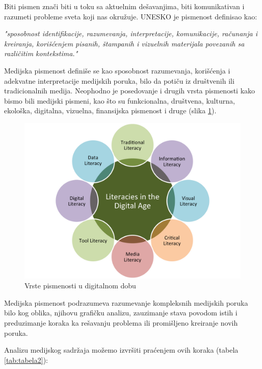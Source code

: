 \documentclass[a4paper]{article}
\begin{document}
Biti pismen znači biti u toku sa aktuelnim dešavanjima, biti komunikativan i razumeti probleme sveta koji nas okružuje. UNESKO je pismenost definisao kao:

\noindent \textit{"sposobnost identifikacije, razumevanja, interpretacije, komunikacije, računanja i kreiranja, korišćenjem pisanih, štampanih i vizuelnih materijala povezanih sa različitim kontekstima."}

Medijska pismenost definiše se kao sposobnost razumevanja, korišćenja i adekvatne interpretacije medijskih poruka, bilo da potiču iz društvenih ili tradicionalnih medija. Neophodno je posedovanje i drugih vrsta pismenosti kako bismo bili medijski pismeni, kao što su funkcionalna, društvena, kulturna, ekološka, digitalna, vizuelna, finansijska pismenost i druge \cite{literacy} (slika \ref{fig:literacies}).  

\begin{figure}[ht!]
\begin{center}
\includegraphics[scale=0.35]{literacies.png}
\end{center}
\caption{Vrste pismenosti u digitalnom dobu}
\label{fig:literacies}
\end{figure}

Medijska pismenost podrazumeva razumevanje kompleksnih medijskih poruka bilo kog oblika, njihovu grafičku analizu, zauzimanje stava povodom istih i preduzimanje koraka ka rešavanju problema ili promišljeno kreiranje novih poruka.

Analizu medijskog sadržaja možemo izvršiti praćenjem ovih koraka \cite{tab2} (tabela \ref{tab:tabela2}):
\end{document}
